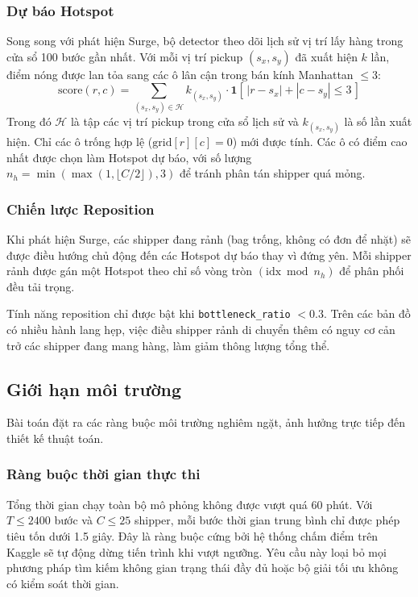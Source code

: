 \documentclass[conference]{IEEEtran}
\begin{document}
\subsubsection{Dự báo Hotspot}
Song song với phát hiện Surge, bộ detector theo dõi lịch sử vị trí lấy hàng trong cửa sổ 100 bước gần nhất. Với mỗi vị trí pickup $(s_x, s_y)$ đã xuất hiện $k$ lần, điểm nóng được lan tỏa sang các ô lân cận trong bán kính Manhattan $\le 3$:
\begin{equation}
\text{score}(r, c) = \sum_{(s_x, s_y) \in \mathcal{H}} k_{(s_x,s_y)} \cdot \mathbf{1}\!\left[\,|r - s_x| + |c - s_y| \le 3\,\right]
\end{equation}
Trong đó $\mathcal{H}$ là tập các vị trí pickup trong cửa sổ lịch sử và $k_{(s_x,s_y)}$ là số lần xuất hiện. Chỉ các ô trống hợp lệ ($\text{grid}[r][c] = 0$) mới được tính. Các ô có điểm cao nhất được chọn làm Hotspot dự báo, với số lượng $n_h = \min(\max(1, \lfloor C/2 \rfloor), 3)$ để tránh phân tán shipper quá mỏng.
 
\subsubsection{Chiến lược Reposition}
Khi phát hiện Surge, các shipper đang rảnh (bag trống, không có đơn để nhặt) sẽ được điều hướng chủ động đến các Hotspot dự báo thay vì đứng yên. Mỗi shipper rảnh được gán một Hotspot theo chỉ số vòng tròn $(\text{idx} \bmod n_h)$ để phân phối đều tải trọng.
 
Tính năng reposition chỉ được bật khi \texttt{bottleneck\_ratio} $< 0.3$. Trên các bản đồ có nhiều hành lang hẹp, việc điều shipper rảnh di chuyển thêm có nguy cơ cản trở các shipper đang mang hàng, làm giảm thông lượng tổng thể.
 
\subsection{Giới hạn môi trường}
Bài toán đặt ra các ràng buộc môi trường nghiêm ngặt, ảnh hưởng trực tiếp đến thiết kế thuật toán.
 
\subsubsection{Ràng buộc thời gian thực thi}
Tổng thời gian chạy toàn bộ mô phỏng không được vượt quá 60 phút. Với $T \le 2400$ bước và $C \le 25$ shipper, mỗi bước thời gian trung bình chỉ được phép tiêu tốn dưới 1.5 giây. Đây là ràng buộc cứng bởi hệ thống chấm điểm trên Kaggle sẽ tự động dừng tiến trình khi vượt ngưỡng. Yêu cầu này loại bỏ mọi phương pháp tìm kiếm không gian trạng thái đầy đủ hoặc bộ giải tối ưu không có kiểm soát thời gian.
 
\end{document}
